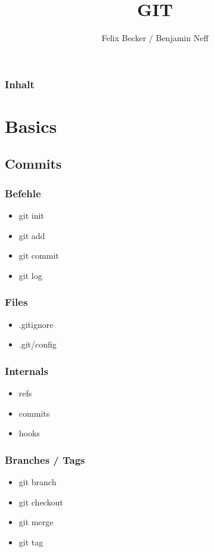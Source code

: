 \documentclass{beamer}
\title{GIT}
\subtitle{}
\institute[Tondorf]{Tondorf 2012}
\author[F. Becker/B. Neff]{
	Felix Becker / Benjamin Neff
}
\begin{document}
	\begin{frame}
		\titlepage
	\end{frame}

	\begin{frame}
		\frametitle{Inhalt}
		\setcounter{tocdepth}{1}
		\tableofcontents
	\end{frame}
	
	\section{Basics}
	
		\subsection{Commits}
			
			\begin{frame}
				\frametitle{Befehle}

				\begin{itemize}
					\item{git init}
					\item{git add}
					\item{git commit}
					\item{git log}
				\end{itemize}
			\end{frame}

			\begin{frame}
				\frametitle{Files}

				\begin{itemize}
					\item{.gitignore}
					\item{.git/config}
				\end{itemize}
			\end{frame}

			\begin{frame}
				\frametitle{Internals}

				\begin{itemize}
					\item{refs}
					\item{commits}
					\item{hooks}
				\end{itemize}
			\end{frame}

			\begin{frame}
				\frametitle{Branches / Tags}

				\begin{itemize}
					\item{git branch}
					\item{git checkout}
					\item{git merge}
					\item{git tag}
				\end{itemize}
			\end{frame}
\end{document}
